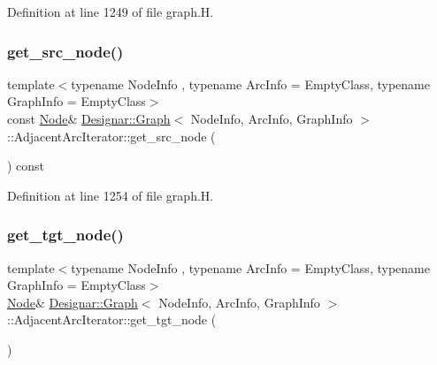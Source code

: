 Definition at line 1249 of file graph.\+H.

\mbox{\label{class_designar_1_1_graph_1_1_adjacent_arc_iterator_ae4ba07319b439cc08df6c957a61bc224}} 
\subsubsection{\texorpdfstring{get\+\_\+src\+\_\+node()}{get\_src\_node()}\hspace{0.1cm}{\footnotesize\ttfamily [2/2]}}
{\footnotesize\ttfamily template$<$typename Node\+Info , typename Arc\+Info  = Empty\+Class, typename Graph\+Info  = Empty\+Class$>$ \\
const \hyperlink{class_designar_1_1_graph_a5dfc7dba9d092ac489c72e40390c37d0}{Node}\& \hyperlink{class_designar_1_1_graph}{Designar\+::\+Graph}$<$ Node\+Info, Arc\+Info, Graph\+Info $>$\+::Adjacent\+Arc\+Iterator\+::get\+\_\+src\+\_\+node (\begin{DoxyParamCaption}{ }\end{DoxyParamCaption}) const\hspace{0.3cm}{\ttfamily [inline]}}



Definition at line 1254 of file graph.\+H.

\mbox{\label{class_designar_1_1_graph_1_1_adjacent_arc_iterator_a400e7399fa39eb49e64afcd2d0b26ff6}} 
\subsubsection{\texorpdfstring{get\+\_\+tgt\+\_\+node()}{get\_tgt\_node()}\hspace{0.1cm}{\footnotesize\ttfamily [1/2]}}
{\footnotesize\ttfamily template$<$typename Node\+Info , typename Arc\+Info  = Empty\+Class, typename Graph\+Info  = Empty\+Class$>$ \\
\hyperlink{class_designar_1_1_graph_a5dfc7dba9d092ac489c72e40390c37d0}{Node}\& \hyperlink{class_designar_1_1_graph}{Designar\+::\+Graph}$<$ Node\+Info, Arc\+Info, Graph\+Info $>$\+::Adjacent\+Arc\+Iterator\+::get\+\_\+tgt\+\_\+node (\begin{DoxyParamCaption}{ }\end{DoxyParamCaption})\hspace{0.3cm}{\ttfamily [inline]}}




